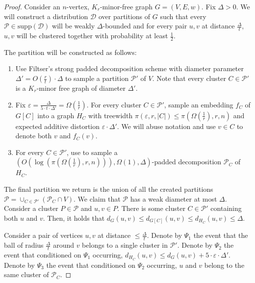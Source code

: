 \documentclass{theoretics}
\newcommand{\supp}{\mathrm{supp}}
\def\cP{\ensuremath{\mathcal{P}}}
\def\eps{\varepsilon}
\begin{document}
\begin{proof}
	Consider an $n$-vertex, $K_r$-minor-free graph $G=\left(V,E,w\right)$. 
	Fix $\Delta>0$. We will construct a distribution $\mathcal{D}$ over partitions of $G$ such that every $\mathcal{P}\in\supp(\mathcal{D})$ will be weakly $\Delta$-bounded and for every pair $u,v$ at distance $\frac{\Delta}{t}$, $u,v$ will be clustered together with probability at least $\frac12$.
	
	The partition will be constructed as follows:
	\begin{enumerate}
		\item Use Filtser's \cite{Fil19Approx} strong padded decomposition scheme with diameter parameter $\Delta'=O(\frac{r}{t})\cdot\Delta$ to sample a partition $\cP'$ of $V$. Note that every cluster $C\in\cP'$ is a $K_r$-minor free graph of diameter $\Delta'$.
		\item Fix $\eps=\frac{\Delta}{5\cdot t\cdot \Delta'}=\Omega(\frac1r)$. For every cluster $C\in\cP'$, sample an embedding $f_C$ of $G[C]$ into a graph $H_C$ with treewidth $\pi(\eps,r,|C|)\le \pi(\Omega(\frac1r),r,n)$ and expected additive distortion $\eps\cdot\Delta'$. We will abuse notation and use $v\in C$ to denote both $v$ and $f_C(v)$.
		\item For every $C\in \cP'$, use  to sample a 
		$\left(O(\log( \pi(\Omega(\frac1r),r,n))),\Omega(1),\Delta\right)$-padded decomposition $\cP_C$ of $H_C$.
	\end{enumerate}
	The final partition we return is the union of all the created partitions $\cP=\cup_{C\in\cP'}(\cP_C\cap V)$. We claim that $\cP$ has a weak diameter at most $\Delta$. Consider a cluster $P\in\cP$ and $u,v\in P$. There is some cluster $C\in\cP'$ containing both $u$ and $v$. Then, it holds that $d_G(u,v)\le  d_{G[C]}(u,v)\le d_{H_C}(u,v)\le\Delta$.
	
	Consider a pair of vertices $u,v$ at distance $\le\frac\Delta t$.  Denote by $\Psi_1$ the event that the ball of radius $\frac\Delta t$
	around $v$ belongs to a single cluster in $\cP'$. Denote by $\Psi_2$ the event that conditioned on $\Psi_1$ occurring, $d_{H_C}(u,v)\le d_{G}(u,v)+5\cdot\eps\cdot\Delta'$. Denote by $\Psi_3$ the event that conditioned on $\Psi_2$ occurring, $u$ and $v$ belong to the same cluster of $\cP_C$.
	

\end{proof}
\end{document}
